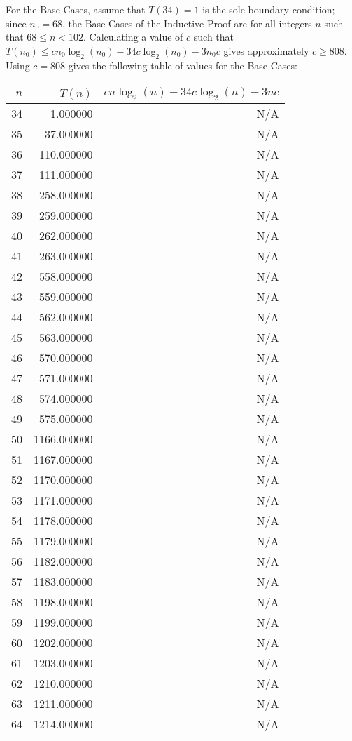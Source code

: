 For the Base Cases, assume that $T(34) = 1$ is the sole boundary condition; since $n_0 = 68$, the Base Cases of the Inductive Proof are for all integers $n$ such that $68 \leq n < 102$.  Calculating a value of $c$ such that $T(n_0) \leq cn_0\log_2(n_0) - 34c\log_2(n_0) - 3n_0c$ gives approximately $c \geq 808$.  Using $c = 808$ gives the following table of values for the Base Cases:
\begin{longtable}{r|r|r}
	$n$ & $T(n)$ & $cn\log_2(n) - 34c\log_2(n) - 3nc$ \\ \hline
	 34 &    1.000000 & N/A \\
	 35 &   37.000000 & N/A \\
	 36 &  110.000000 & N/A \\
	 37 &  111.000000 & N/A \\
	 38 &  258.000000 & N/A \\
	 39 &  259.000000 & N/A \\
	 40 &  262.000000 & N/A \\
	 41 &  263.000000 & N/A \\
	 42 &  558.000000 & N/A \\
	 43 &  559.000000 & N/A \\
	 44 &  562.000000 & N/A \\
	 45 &  563.000000 & N/A \\
	 46 &  570.000000 & N/A \\
	 47 &  571.000000 & N/A \\
	 48 &  574.000000 & N/A \\
	 49 &  575.000000 & N/A \\
	 50 & 1166.000000 & N/A \\
	 51 & 1167.000000 & N/A \\
	 52 & 1170.000000 & N/A \\
	 53 & 1171.000000 & N/A \\
	 54 & 1178.000000 & N/A \\
	 55 & 1179.000000 & N/A \\
	 56 & 1182.000000 & N/A \\
	 57 & 1183.000000 & N/A \\
	 58 & 1198.000000 & N/A \\
	 59 & 1199.000000 & N/A \\
	 60 & 1202.000000 & N/A \\
	 61 & 1203.000000 & N/A \\
	 62 & 1210.000000 & N/A \\
	 63 & 1211.000000 & N/A \\
	 64 & 1214.000000 & N/A \\

\end{longtable}
